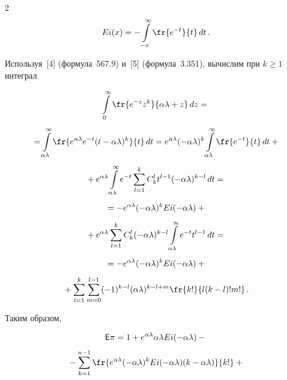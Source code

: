 \begin{multicols}{2}
$$


Ei(x)=-\il{-x}{\infty}\fr{e^{-t}}{t}\,dt\,.


$$





Используя~[4] (формула~567.9) и~[5] (формула~3.351), вычислим при $k\ge1$ интеграл


\begin{multline*}


\il{0}{\infty}\fr{e^{-z}z^k}{\alpha\lambda+z}\,dz={}\\[5pt]


{}=\il{\alpha\lambda}{\infty}\fr{e^{\alpha\lambda}e^{-t}(t-\alpha\lambda)^k}{t}\,dt=


e^{\alpha\lambda}(-\alpha\lambda)^k\il{\alpha\lambda}{\infty}\fr{e^{-t}}{t}\,dt+{}\\[5pt]


{}+e^{\alpha\lambda}\il{\alpha\lambda}{\infty}e^{-t}\sum_{l=1}^k C_k^l t^{l-1}(-\alpha\lambda)^{k-l}\, dt={}\\[5pt]


{}=-e^{\alpha\lambda}(-\alpha\lambda)^k Ei(-\alpha\lambda)+{}\\[5pt]


{}+e^{\alpha\lambda}\sum_{l=1}^k


C_k^l(-\alpha\lambda)^{k-l}\il{\alpha\lambda}{\infty}e^{-t}t^{l-1}\,dt={}\\[5pt]


{}=-e^{\alpha\lambda}(-\alpha\lambda)^k


Ei(-\alpha\lambda)+{}\\[5pt]


{}+\sum_{l=1}^k\sum_{m=0}^{l-1}(-1)^{k-l}(\alpha\lambda)^{k-l+m}\fr{k!}{l(k-l)!m!}\,.


\end{multline*}


%


Таким образом,






{\begin{multline*}


\e\pi=  1+e^{\alpha\lambda}\alpha\lambda Ei(-\alpha\lambda)-{}\\[4pt]


{}-\sum_{k=1}^{n-1}\fr{e^{\alpha\lambda} (-\alpha\lambda)^{k}


Ei(-\alpha\lambda)(k-\alpha\lambda)}{k!}+{}\\[4pt]



\end{multline*}}
\end{multicols}
